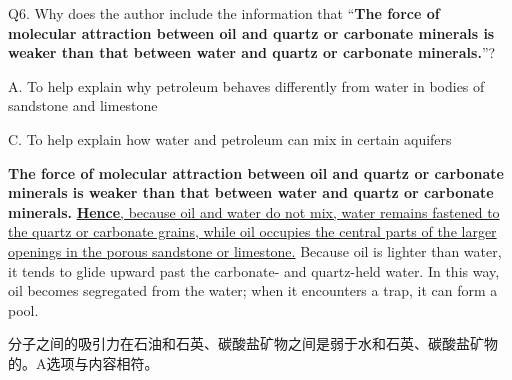 \begin{blk}
    \begin{qst}
        Q6. Why does the author include the information that “\textbf{The force of molecular attraction between oil and quartz or carbonate minerals is weaker than that between water and quartz or carbonate minerals.}”?
    \end{qst}

    \begin{chc}
        A. To help explain why petroleum behaves differently from water in bodies of sandstone and limestone

        C. To help explain how water and petroleum can mix in certain aquifers
    \end{chc}

    \begin{psgq}
        \textbf{The force of molecular attraction between oil and quartz or carbonate minerals is weaker than that between water and quartz or carbonate minerals.} \ul{\textbf{Hence}, because oil and water do not mix, water remains fastened to the quartz or carbonate grains, while oil occupies the central parts of the larger openings in the porous sandstone or limestone.} Because oil is lighter than water, it tends to glide upward past the carbonate- and quartz-held water. In this way, oil becomes segregated from the water; when it encounters a trap, it can form a pool.
    \end{psgq}

    \begin{nlz}
        分子之间的吸引力在石油和石英、碳酸盐矿物之间是弱于水和石英、碳酸盐矿物的。A选项与内容相符。
    \end{nlz}
\end{blk}

\newpage